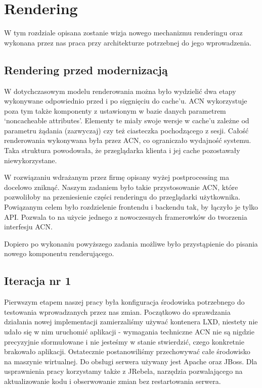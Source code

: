 \documentclass[licencjacka]{pracamgr}
\begin{document}
\chapter{Rendering}

W tym rozdziale opisana zostanie wizja nowego mechanizmu renderingu oraz wykonana przez nas praca przy architekturze potrzebnej do jego wprowadzenia.

\section{Rendering przed modernizacją}

W dotychczasowym modelu renderowania można było wydzielić dwa etapy wykonywane odpowiednio przed i po sięgnięciu do cache'u. ACN wykorzystuje poza tym także komponenty z ustawionym w bazie danych parametrem ‘noncacheable attributes’. Elementy te miały swoje wersje w cache’u zależne od parametru żądania (zazwyczaj) czy też ciasteczka pochodzącego z sesji. 
Całość renderowania wykonywana była przez ACN, co ograniczało wydajność systemu. Taka struktura powodowała, że przeglądarka klienta i jej cache pozostawały niewykorzystane.

\vspace{1mm}

W rozwiązaniu wdrażanym przez firmę opisany wyżej postprocessing ma docelowo zniknąć. Naszym zadaniem było takie przystosowanie ACN, które pozwoliłoby na przeniesienie części renderingu do przeglądarki użytkownika. Powiązanym celem było rozdzielenie frontendu i backendu tak, by łączyło je tylko API. Pozwala to na użycie jednego z nowoczesnych framerowków do tworzenia interfesju ACN. 

\vspace{1mm}	
	
Dopiero po wykonaniu powyższego zadania możliwe było przystąpienie do pisania nowego komponentu renderującego.

\section{Iteracja nr 1}
	
Pierwszym etapem naszej pracy była konfiguracja środowiska potrzebnego do testowania wprowadzanych przez nas zmian. Początkowo do sprawdzania działania nowej implementacji zamierzaliśmy używać kontenera LXD, niestety nie udało się w nim uruchomić aplikacji - wymagania techniczne ACN nie są nigdzie precyzyjnie sformułowane i nie jesteśmy w stanie stwierdzić, czego konkretnie brakowało aplikacji. Ostatecznie postanowiliśmy przechowywać całe środowisko na maszynie wirtualnej. Do obsługi serwera używany jest Apache oraz JBoss. Dla usprawnienia pracy korzystamy także z JRebela, narzędzia pozwalającego na aktualizowanie kodu i obserwowanie zmian bez restartowania serwera.
\end{document}
